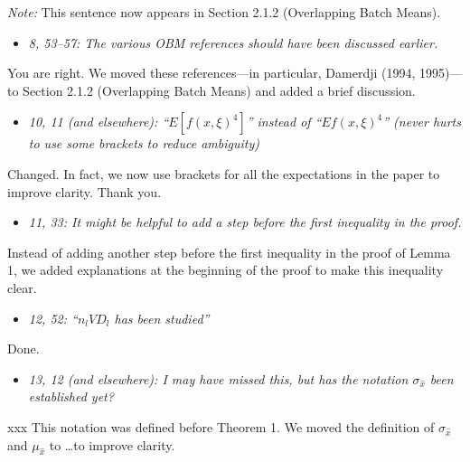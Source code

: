 \documentclass[11pt,notitlepage,onecolumn]{article}
\newcommand{\noi}{\noindent}
\begin{document}
\noi 
{\it Note:} This sentence now appears in Section 2.1.2 (Overlapping Batch Means). 
\medskip 



\begin{itemize}
\item[] \textit{8, 53--57: The various OBM references should have been discussed earlier.}
\end{itemize}

\noi
You are right. 
We moved these references---in particular, Damerdji (1994, 1995)---to Section 2.1.2 (Overlapping Batch Means) and added a brief discussion.  
\medskip 



\begin{itemize}
\item[] \textit{10, 11 (and elsewhere): ``$E[f(x, \xi)^4]$'' instead of ``$Ef(x, \xi)^4$'' (never hurts to use some brackets to reduce ambiguity)}
\end{itemize}

\noi
Changed.
In fact, we now use brackets for all the expectations in the paper to improve clarity. 
Thank you.
\medskip 



\begin{itemize}
\item[] \textit{11, 33: It might be helpful to add a step before the first inequality in the proof.}
\end{itemize}

\noi
Instead of adding another step before the first inequality in the proof of Lemma 1, we added explanations at the beginning of the proof to make this inequality clear.   
\medskip 



\begin{itemize}
\item[] \textit{12, 52: ``$n_l VD_l$ has been studied''}
\end{itemize}

\noi
Done.
\medskip 



\begin{itemize}
\item[] \textit{13, 12 (and elsewhere): I may have missed this, but has the notation $\sigma_{\hat{x}}$ been established yet?}
\end{itemize}

\noi
xxx 
This notation was defined before Theorem 1. 
We moved the definition of $\sigma_{\hat{x}}$ and $\mu_{\hat{x}}$ to \ldots to improve clarity. 
\medskip 
\end{document}
